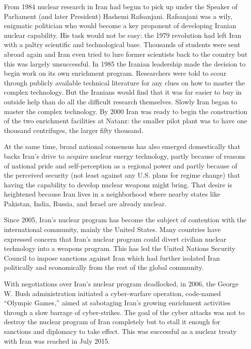\documentclass[12pt]{article}
\begin{document}
From 1984 nuclear research in Iran had begun to pick up under the Speaker of Parliament (and later President) Hashemi Rafsanjani. Rafsanjani was a wily, enigmatic politician who would become a key proponent of developing Iranian nuclear capability. His task would not be easy: the 1979 revolution had left Iran with a paltry scientific and technological base. Thousands of students were sent abroad again and Iran even tried to lure former scientists back to the country but this was largely unsuccessful.
In 1985 the Iranian leadership made the decision to begin work on its own enrichment program. Researchers were told to scour through publicly available technical literature for any clues on how to master the complex technology. But the Iranians would find that it was far easier to buy in outside help than do all the difficult research themselves. Slowly Iran began to master the complex technology. By 2000 Iran was ready to begin the construction of the two enrichment facilities at Natanz: the smaller pilot plant was to have one thousand centrifuges, the larger fifty thousand.

At the same time,  broad national consensus has also emerged domestically that backs Iran’s drive to acquire nuclear energy technology, partly because of reasons of national pride and self-perception as a regional power and partly because of the perceived security (not least against any U.S. plans for regime change) that having the capability to develop nuclear weapons might bring. That desire is heightened because Iran lives in a neighborhood where nearby states like Pakistan, India, Russia, and Israel are already nuclear. 

Since 2005, Iran's nuclear program has become the subject of contention with the international community, mainly the United States. Many countries have expressed concern that Iran's nuclear program could divert civilian nuclear technology into a weapons program. This has led the United Nations Security Council to impose sanctions against Iran which had further isolated Iran politically and economically from the rest of the global community. 

With negotiations over Iran’s nuclear program deadlocked, in 2006, the George W. Bush administration initiated a cyber-warfare operation, code-named “Olympic Games,” aimed at sabotaging Iran’s growing enrichment activities through a slow barrage of cyber-strikes.
The goal of the cyber attacks was not to destroy the nuclear program of Iran completely but to stall it enough for sanctions and diplomacy to take effect. This was successful as a nuclear treaty with Iran was reached in July 2015.
\end{document}

